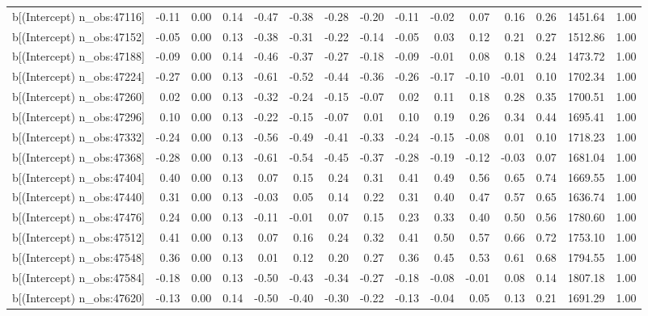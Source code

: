 \begin{table}[ht]
\begin{tabular}{rrrrrrrrrrrrrrr}
  b[(Intercept) n\_obs:47116] & -0.11 & 0.00 & 0.14 & -0.47 & -0.38 & -0.28 & -0.20 & -0.11 & -0.02 & 0.07 & 0.16 & 0.26 & 1451.64 & 1.00 \\ 
  b[(Intercept) n\_obs:47152] & -0.05 & 0.00 & 0.13 & -0.38 & -0.31 & -0.22 & -0.14 & -0.05 & 0.03 & 0.12 & 0.21 & 0.27 & 1512.86 & 1.00 \\ 
  b[(Intercept) n\_obs:47188] & -0.09 & 0.00 & 0.14 & -0.46 & -0.37 & -0.27 & -0.18 & -0.09 & -0.01 & 0.08 & 0.18 & 0.24 & 1473.72 & 1.00 \\ 
  b[(Intercept) n\_obs:47224] & -0.27 & 0.00 & 0.13 & -0.61 & -0.52 & -0.44 & -0.36 & -0.26 & -0.17 & -0.10 & -0.01 & 0.10 & 1702.34 & 1.00 \\ 
  b[(Intercept) n\_obs:47260] & 0.02 & 0.00 & 0.13 & -0.32 & -0.24 & -0.15 & -0.07 & 0.02 & 0.11 & 0.18 & 0.28 & 0.35 & 1700.51 & 1.00 \\ 
  b[(Intercept) n\_obs:47296] & 0.10 & 0.00 & 0.13 & -0.22 & -0.15 & -0.07 & 0.01 & 0.10 & 0.19 & 0.26 & 0.34 & 0.44 & 1695.41 & 1.00 \\ 
  b[(Intercept) n\_obs:47332] & -0.24 & 0.00 & 0.13 & -0.56 & -0.49 & -0.41 & -0.33 & -0.24 & -0.15 & -0.08 & 0.01 & 0.10 & 1718.23 & 1.00 \\ 
  b[(Intercept) n\_obs:47368] & -0.28 & 0.00 & 0.13 & -0.61 & -0.54 & -0.45 & -0.37 & -0.28 & -0.19 & -0.12 & -0.03 & 0.07 & 1681.04 & 1.00 \\ 
  b[(Intercept) n\_obs:47404] & 0.40 & 0.00 & 0.13 & 0.07 & 0.15 & 0.24 & 0.31 & 0.41 & 0.49 & 0.56 & 0.65 & 0.74 & 1669.55 & 1.00 \\ 
  b[(Intercept) n\_obs:47440] & 0.31 & 0.00 & 0.13 & -0.03 & 0.05 & 0.14 & 0.22 & 0.31 & 0.40 & 0.47 & 0.57 & 0.65 & 1636.74 & 1.00 \\ 
  b[(Intercept) n\_obs:47476] & 0.24 & 0.00 & 0.13 & -0.11 & -0.01 & 0.07 & 0.15 & 0.23 & 0.33 & 0.40 & 0.50 & 0.56 & 1780.60 & 1.00 \\ 
  b[(Intercept) n\_obs:47512] & 0.41 & 0.00 & 0.13 & 0.07 & 0.16 & 0.24 & 0.32 & 0.41 & 0.50 & 0.57 & 0.66 & 0.72 & 1753.10 & 1.00 \\ 
  b[(Intercept) n\_obs:47548] & 0.36 & 0.00 & 0.13 & 0.01 & 0.12 & 0.20 & 0.27 & 0.36 & 0.45 & 0.53 & 0.61 & 0.68 & 1794.55 & 1.00 \\ 
  b[(Intercept) n\_obs:47584] & -0.18 & 0.00 & 0.13 & -0.50 & -0.43 & -0.34 & -0.27 & -0.18 & -0.08 & -0.01 & 0.08 & 0.14 & 1807.18 & 1.00 \\ 
  b[(Intercept) n\_obs:47620] & -0.13 & 0.00 & 0.14 & -0.50 & -0.40 & -0.30 & -0.22 & -0.13 & -0.04 & 0.05 & 0.13 & 0.21 & 1691.29 & 1.00 \\ 

\end{tabular}
\end{table}
